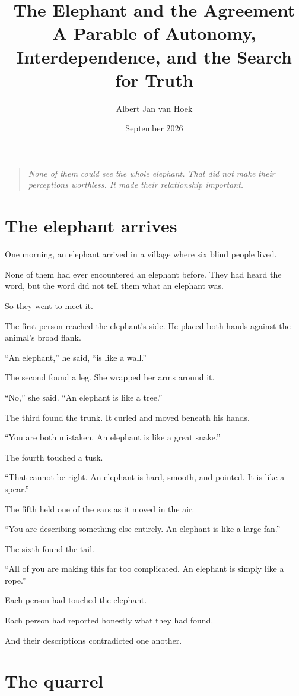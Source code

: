 \documentclass[11pt,a4paper]{article}
\title{\textbf{The Elephant and the Agreement}\\
\large A Parable of Autonomy, Interdependence, and the Search for Truth}
\author{Albert Jan van Hoek}
\date{September 2026}
\begin{document}
\maketitle

\begin{quote}
\emph{None of them could see the whole elephant. That did not make their perceptions worthless. It made their relationship important.}
\end{quote}

\section*{The elephant arrives}

One morning, an elephant arrived in a village where six blind people lived.

None of them had ever encountered an elephant before. They had heard the word, but the word did not tell them what an elephant was.

So they went to meet it.

The first person reached the elephant's side. He placed both hands against the animal's broad flank.

``An elephant,'' he said, ``is like a wall.''

The second found a leg. She wrapped her arms around it.

``No,'' she said. ``An elephant is like a tree.''

The third found the trunk. It curled and moved beneath his hands.

``You are both mistaken. An elephant is like a great snake.''

The fourth touched a tusk.

``That cannot be right. An elephant is hard, smooth, and pointed. It is like a spear.''

The fifth held one of the ears as it moved in the air.

``You are describing something else entirely. An elephant is like a large fan.''

The sixth found the tail.

``All of you are making this far too complicated. An elephant is simply like a rope.''

Each person had touched the elephant.

Each person had reported honestly what they had found.

And their descriptions contradicted one another.

\section*{The quarrel}
\end{document}
